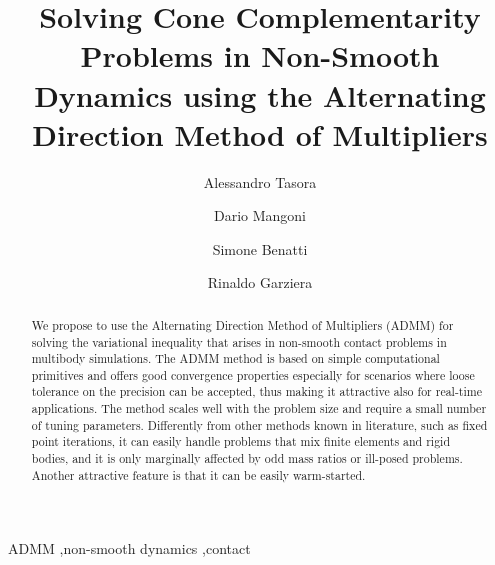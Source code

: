 \documentclass[final,3p]{elsarticle}
\begin{document}


\title{Solving Cone Complementarity Problems in Non-Smooth Dynamics using the Alternating Direction Method of Multipliers}

\author{Alessandro Tasora}
\author{Dario Mangoni}
\author{Simone Benatti}
\author{Rinaldo Garziera}
\address{Universit\`a degli Studi di Parma, \\Dpt. of Engineering and Architecture\\Parco Area delle Scienze, 181/A, 43124 Parma, Italy }



\begin{abstract}
We propose to use the Alternating Direction Method of Multipliers (ADMM) for solving the variational inequality that arises in non-smooth contact problems in multibody simulations. The ADMM method is based on simple computational primitives and offers good convergence properties especially for scenarios where loose tolerance on the precision can be accepted, thus making it attractive also for real-time applications. The method scales well with the problem size and require a small number of tuning parameters. Differently from other methods known in literature, such as fixed point iterations, it can easily handle problems that mix finite elements and rigid bodies, and it is only marginally affected by odd mass ratios or ill-posed problems. Another attractive feature is that it can be easily warm-started.
\end{abstract}
%
\begin{keyword}
ADMM \sep non-smooth dynamics \sep contact
\end{keyword}


\maketitle              %
\end{document}
